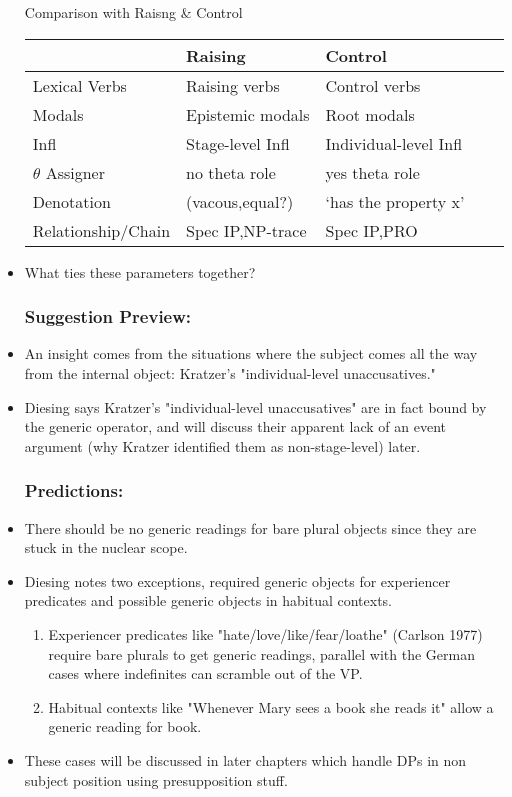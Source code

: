 \documentclass[landscape]{article}
\begin{document}
\begin{itemize}
\begin{example}Comparison with Raisng \& Control\\
\begin{tabular}{lllll}
& Raising & Control\\\hline
Lexical Verbs& Raising verbs & Control verbs\\
Modals & Epistemic modals & Root modals\\
Infl& Stage-level Infl & Individual-level Infl\\
$\theta$ Assigner& no theta role  & yes theta role\\
Denotation &(vacous,equal?) & `has the property x'\\
Relationship/Chain&Spec IP,NP-trace & Spec IP,PRO\\
\end{tabular}
\end{example}

\item What ties these parameters together? 

\subsubsection*{Suggestion Preview:}
\item An insight comes from the situations where the subject comes all the way from the internal object:    Kratzer's "individual-level unaccusatives."

\item Diesing says Kratzer's "individual-level unaccusatives" are in fact bound by the generic operator, and will discuss their apparent lack of an event argument (why Kratzer identified them as non-stage-level) later.

\subsubsection*{Predictions:}
\item There should be no generic readings for bare plural objects since they are stuck in the nuclear scope.

\item Diesing notes two exceptions, required generic objects for experiencer predicates and possible generic objects in habitual contexts.

\begin{enumerate}
\item Experiencer predicates like "hate/love/like/fear/loathe" (Carlson 1977) require bare plurals to get generic readings, parallel with the German cases where indefinites can scramble out of the VP. 
\item Habitual contexts like "Whenever Mary sees a book she reads it" allow a generic reading for book.
\end{enumerate}

\item These cases will be discussed in later chapters which handle DPs in non subject position using presupposition stuff.
\end{itemize}
\end{document}
